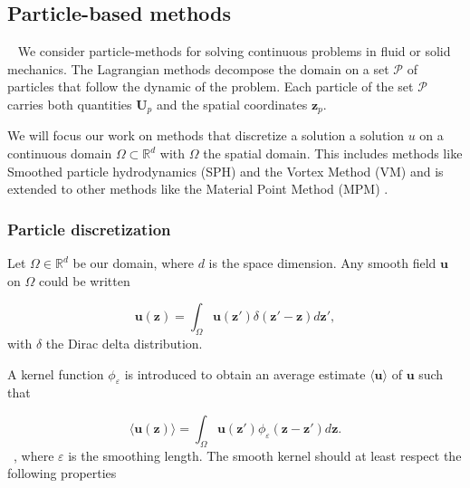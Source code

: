 
\subsection{Particle-based methods}~\label{Background_Part}
We consider particle-methods for solving continuous problems in fluid or solid mechanics. The Lagrangian methods decompose the domain on a set $\mathcal P$ of particles that follow the dynamic of the problem. Each particle of the set $\mathcal P$ carries both quantities $\bm U_p$ and the spatial coordinates $\bm z_p$.


We will focus our work on methods that discretize a solution a solution $u$ on a continuous domain $\Omega \subset \mathbb{R}^d$ with $\Omega$ the spatial domain. This includes methods like Smoothed particle hydrodynamics (SPH) \cite{gingold_monaghan_sph_1977,lucy_1977} and the Vortex Method (VM) \cite{cottet_vortex_2000} and is extended to other methods like the Material Point Method (MPM) \cite{sulsky_particle_1994}.

\subsubsection{Particle discretization}

Let $\Omega \in \mathbb R^d$ be our domain, where $d$ is the space dimension. Any smooth field $\bm u$ on $\Omega$ could be written

\begin{equation*}
	\bm u(\bm z) = \int_{\Omega} \bm u(\bm z') \delta(\bm z' - \bm z)  d\bm z',
\end{equation*}with $\delta$ the Dirac delta distribution.

A kernel function $\phi_\varepsilon$ is introduced to obtain an average estimate $\langle \bm u \rangle$ of $\bm u$ such that

\begin{equation*}
	\langle \bm u(\bm z) \rangle = \int_{\Omega} \bm u(\bm z') \phi_\varepsilon(\bm z-\bm z') d\bm z.
\end{equation*}~, where $\varepsilon$ is the smoothing length. The smooth kernel should at least respect the following properties

